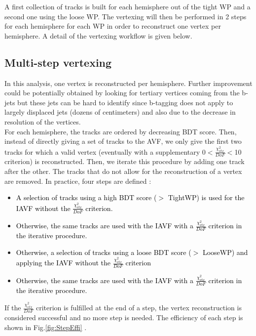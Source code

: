 \documentclass{cernatlasnote}
\begin{document}
A first collection of tracks is built for each hemisphere out of the tight WP and a second one using the loose WP. The vertexing will then be performed in 2 steps for each hemisphere for each WP in order to reconstruct one vertex per hemisphere. A detail of the vertexing workflow is given below.
    
\subsection{Multi-step vertexing}
In this analysis, one vertex is reconstructed per hemisphere. Further improvement could be potentially obtained by looking for tertiary vertices coming from the b-jets but these jets can be hard to identify since b-tagging does not apply to largely displaced jets (dozens of centimeters) and also due to the decrease in resolution of the vertices.\\

For each hemisphere, the tracks are ordered by decreasing BDT score. Then, instead of directly giving a set of tracks to the AVF, we only give the first two tracks for which a valid vertex (eventually with a supplementary 0$<\frac{\chi^2_{vtx}}{DoF}<$10 criterion) is reconstructed. Then, we iterate this procedure by adding one track after the other. The tracks that do not allow for the reconstruction of a vertex are removed. In practice, four steps are defined :
\begin{itemize}
     \item \textcolor{black}{ A selection of tracks using a high BDT score ($>$ TightWP) is used for the IAVF without the $\frac{\chi^2_{vtx}}{DoF}$ criterion.}
    \item \textcolor{black}{ Otherwise, the same tracks are used with the IAVF with a $\frac{\chi^2_{vtx}}{DoF}$ criterion in the iterative procedure.}
    \item \textcolor{black}{ Otherwise, a selection of tracks using a loose BDT score ($>$ LooseWP) and applying the IAVF without the $\frac{\chi^2_{vtx}}{DoF}$ criterion}
    \item  \textcolor{black}{ Otherwise, the same tracks are used with the IAVF with a $\frac{\chi^2_{vtx}}{DoF}$ criterion in the iterative procedure.}
\end{itemize}

If the $\frac{\chi^2_{vtx}}{DoF}$ criterion is fulfilled at the end of a step, the vertex reconstruction is  considered successful and no more step is needed. The efficiency of each step is shown in Fig.\ref{fig:StepEffi} .
\end{document}
